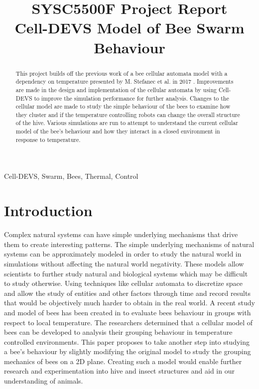 \documentclass[conference,compsoc,onecolumn]{IEEEtran}
\begin{document}
\title{SYSC5500F Project Report\\ Cell-DEVS Model of Bee Swarm Behaviour}

\author{
}

\maketitle

\begin{abstract}
This project builds off the previous work of a bee cellular automata model with a dependency on temperature presented by M. Stefanec et al. in 2017 \cite{Stefanc2017}. Improvements are made in the design and implementation of the cellular automata by using Cell-DEVS to improve the simulation performance for further analysis. Changes to the cellular model are made to study the simple behaviour of the bees to examine how they cluster and if the temperature controlling robots can change the overall structure of the hive. Various simulations are run to attempt to understand the current cellular model of the bee's behaviour and how they interact in a closed environment in response to temperature.
\end{abstract}

\begin{IEEEkeywords}
	Cell-DEVS, Swarm, Bees, Thermal, Control
\end{IEEEkeywords}

\section{Introduction}

Complex natural systems can have simple underlying mechanisms that drive them to create interesting patterns. The simple underlying mechanisms of natural systems can be approximately modeled in order to study the natural world in simulations without affecting the natural world negativity. These models allow scientists to further study natural and biological systems which may be difficult to study otherwise. Using techniques like cellular automata to discretize space and allow the study of entities and other factors through time and record results that would be objectively much harder to obtain in the real world. A recent study and model of bees has been created in \cite{Stefanc2017, Szopek2017} to evaluate bees behaviour in groups with respect to local temperature. The researchers determined that a cellular model of bees can be developed to analysis their grouping behaviour in temperature controlled environments. This paper proposes to take another step into studying a bee's behaviour by slightly modifying the original model to study the grouping mechanics of bees on a 2D plane. Creating such a model would enable further research and experimentation into hive and insect structures and aid in our understanding of animals.
\end{document}

